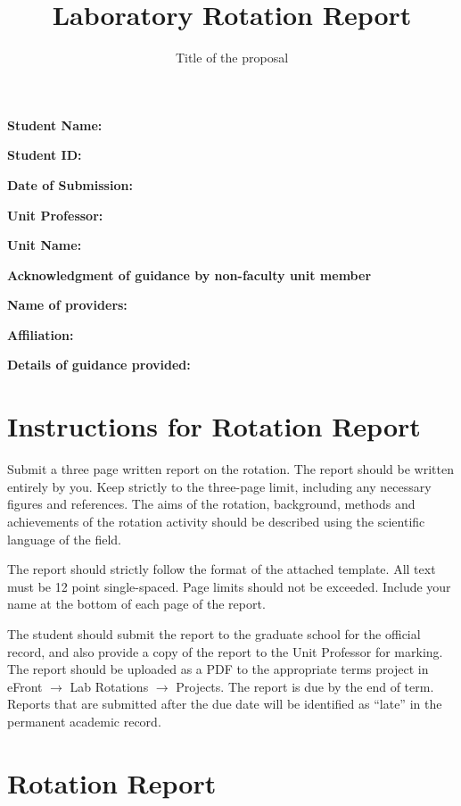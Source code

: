 \documentclass[paper=a4wide, fontsize=12pt]{scrartcl}	 %
\title{\vspace{-1.8cm}  \color{DarkRed} Laboratory Rotation Report}
\subtitle{Title of the proposal %
\vspace{-2cm} }
\date{} %
\begin{document}
\maketitle %
\thispagestyle{fancy} %


\vspace{-0.5cm} \textbf{Student Name:}

\textbf{Student ID:}

\textbf{Date of Submission:}

\textbf{Unit Professor:}

\textbf{Unit Name:}

\vspace{3mm} \textbf{Acknowledgment of guidance by non-faculty unit member}

\textbf{Name of providers:}

\textbf{Affiliation:}

\textbf{Details of guidance provided:}


\vspace{0.5cm}

\section*{Instructions for Rotation Report}

Submit a three page written report on the rotation. The report should be written entirely by you. Keep strictly to the three-page limit, including any necessary figures and references. The aims of the rotation, background, methods and achievements of the rotation activity should be described using the scientific language of the field.

The report should strictly follow the format of the attached template. All text must be 12 point single-spaced. Page limits should not be exceeded. Include your name at the bottom of each page of the report.

The student should submit the report to the graduate school for the official record, and also provide a copy of the report to the Unit Professor for marking. The report should be uploaded as a PDF to the appropriate terms project in eFront $\rightarrow$ Lab Rotations  $\rightarrow$ Projects. The report is due by the end of term. Reports that are submitted after the due date will be identified as ``late'' in the permanent academic record.


\section*{Rotation Report}
\end{document}
